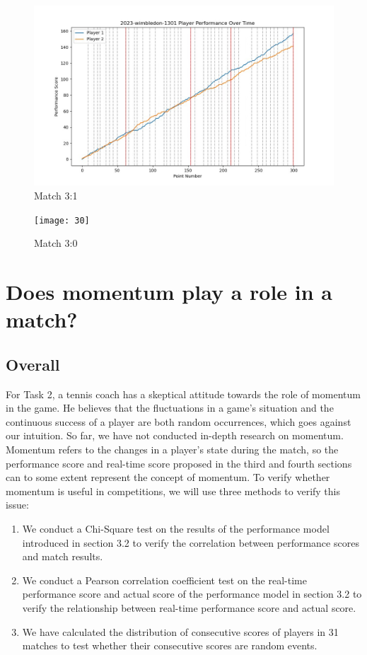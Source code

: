 \documentclass{mcmthesis}
\begin{document}
\begin{figure}[h]
\centering
\includegraphics[width=12cm]{figures/31.JPG}
\caption{Match 3:1} \label{fig:aa}
\end{figure}

\begin{figure}[h]
\centering
\texttt{[image: 30]}
\caption{Match 3:0} \label{fig:aa}
\end{figure}


\section{Does momentum play a role in a match?}
\subsection{Overall}
For Task 2, a tennis coach has a skeptical attitude towards the role of momentum in the game. He believes that the fluctuations in a game's situation and the continuous success of a player are both random occurrences, which goes against our intuition. So far, we have not conducted in-depth research on momentum. Momentum refers to the changes in a player's state during the match, so the performance score and real-time score proposed in the third and fourth sections can to some extent represent the concept of momentum. To verify whether momentum is useful in competitions, we will use three methods to verify this issue:
\begin{enumerate}
  \item We conduct a Chi-Square test on the results of the performance model introduced in section 3.2 to verify the correlation between performance scores and match results.
  \item We conduct a Pearson correlation coefficient test on the real-time performance score and actual score of the performance model in section 3.2 to verify the relationship between real-time performance score and actual score.
  \item We have calculated the distribution of consecutive scores of players in 31 matches to test whether their consecutive scores are random events.
\end{enumerate}
\end{document}
